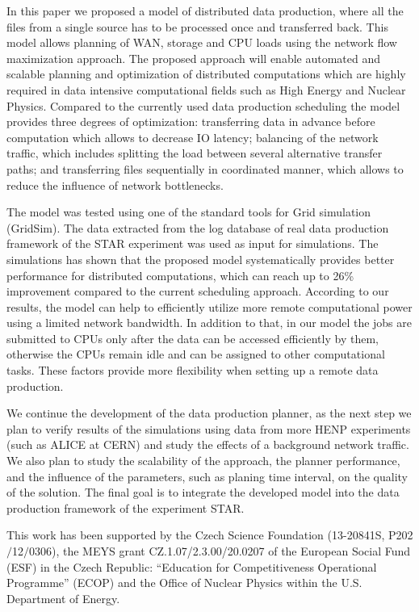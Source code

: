 \documentclass{svjour3}                     %
\begin{document}
In this paper we proposed a model of distributed data production, where all
the files from a single source has to be processed once and transferred back.
This model allows planning of WAN, storage and CPU loads using the network
flow maximization approach. The proposed approach will enable automated and scalable planning and optimization of distributed computations which are highly required in data intensive computational fields such as High Energy and Nuclear Physics. Compared to the currently used data production scheduling the model provides three degrees of optimization: transferring data in advance before computation which allows to decrease IO latency; balancing of the network traffic, which includes splitting the load between several alternative transfer paths; and transferring  files sequentially in coordinated manner, which allows to reduce the influence of network bottlenecks.

The model was tested using one of the standard tools for Grid simulation (GridSim). The data extracted from the log database of real data production framework of the STAR experiment was used as input for simulations. The simulations has shown that the proposed model systematically provides better performance for distributed computations, which can reach up to 26\% improvement compared to the current scheduling approach. According to our results, the model can help to efficiently utilize more remote computational power using a limited network bandwidth. In addition to that, in our model the jobs are submitted to CPUs only after the data can be accessed efficiently by them, otherwise the CPUs remain idle and can be assigned to other computational tasks. These factors provide more flexibility when setting up a remote data production.

We continue the development of the data production planner, as the next step we plan to verify results of the simulations using data from more HENP experiments (such as ALICE at CERN) and study the effects of a background network traffic. We also plan to study the scalability of the approach, the planner performance, and the influence of the parameters, such as planing time interval, on the quality of the solution. The final goal is to integrate the developed model into the data production framework of the experiment STAR.


\begin{acknowledgements}
This work has been supported by the Czech Science Foundation
(13-20841S, P202$/$12$/$0306),  the MEYS grant CZ.1.07/2.3.00/20.0207 of the European Social Fund (ESF) in the Czech Republic: “Education for Competitiveness Operational Programme” (ECOP) and the Office of Nuclear Physics within the U.S. Department of Energy.  
\end{acknowledgements}

{}

\end{document}
